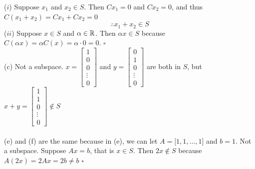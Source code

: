 \documentclass[letterpaper]{article}
\begin{document}
($i$) Suppose $x_1$ and $x_2 \in S$. Then $C x_1=0$ and $C x_2 = 0$, and thus $C(x_1 + x_2) = C x_1 + C x_2 = 0$
$$\therefore x_1 +x_2 \in S$$
($ii$) Suppose $x \in S$ and $\alpha \in \mathbb R$. Then $\alpha x \in S$ because $C(\alpha x) = \alpha C(x) = \alpha \cdot 0 = 0$. \hfill $\square$
\medskip \\
(c) Not a subspace.
$x=\begin{bmatrix} 1 \\ 0 \\ 0 \\ \vdots \\ 0 \end{bmatrix}$ and $y=\begin{bmatrix} 0 \\ 1 \\ 0 \\ \vdots \\ 0 \end{bmatrix}$ are both in $S$, but $x+y=\begin{bmatrix} 1 \\ 1 \\ 0 \\ \vdots \\ 0 \end{bmatrix}\notin S$ \\
\medskip \\
(e) and (f) are the same because in (e), we can let $A=\big[ 1,1, \ldots,1\big]$ and $b=1$.
Not a subspace. Suppose $Ax=b$, that is $x\in S$. Then $2x\notin S$ because $A(2x)=2Ax=2b \not= b$ \hfill $\square$
\end{document}
